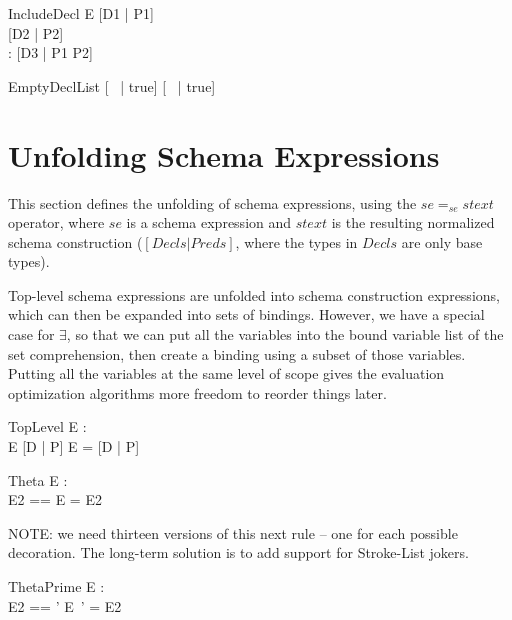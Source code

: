 \documentclass{article}
\newcommand{\sexprUnfoldsTo}{\mathrel{=_{se}}}
\newcommand{\declListUnfoldsTo}{\mathrel{=_d}}
\begin{document}
\begin{zedrule}{IncludeDecl}
   E \sexprUnfoldsTo [D1 | P1] \\
   [D | true] \declListUnfoldsTo [D2 | P2] \\
   \proviso [D1 | true] \land [D2 | true] : \power [D3]
\derives
   [E; D | true] \declListUnfoldsTo [D3 |  P1 \land P2]
\end{zedrule}

\begin{zedrule}{EmptyDeclList}
   [~ | true] \declListUnfoldsTo [~ | true]
\end{zedrule}


\section{Unfolding Schema Expressions}

This section defines the unfolding of schema expressions,
using the $se \sexprUnfoldsTo stext$ operator, where $se$
is a schema expression and $stext$ is the resulting normalized
schema construction ($[Decls|Preds]$, where the types in $Decls$
are only base types).

Top-level schema expressions are unfolded into schema construction
expressions, which can then be expanded into sets of bindings.
However, we have a special case for $\exists$, so that we can
put all the variables into the bound variable list of the
set comprehension, then create a binding using a subset of
those variables.  Putting all the variables at the same level
of scope gives the evaluation optimization algorithms more
freedom to reorder things later.

\begin{zedrule}{TopLevel}
  \proviso E : \power [D2] \\
  E  \sexprUnfoldsTo [D | P]
\derives
  E = [D | P]
\end{zedrule}

\begin{zedrule}{Theta}
  \proviso E : \power [D] \\
  \proviso E2 == \theta [D | true]
\derives
  \theta E = E2
\end{zedrule}

NOTE: we need thirteen versions of this next rule -- one for
each possible decoration.  The long-term solution is to add
support for Stroke-List jokers.
\begin{zedrule}{ThetaPrime}
  \proviso E : \power [D] \\
  \proviso E2 == \theta [D | true] '
\derives
  \theta E~' = E2
\end{zedrule}
\end{document}

